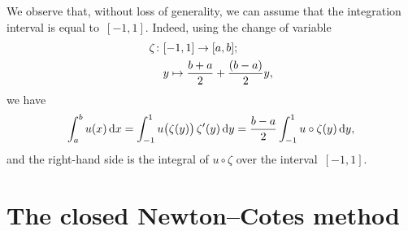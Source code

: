 We observe that,
without loss of generality,
we can assume that the integration interval is equal to~$[-1, 1]$.
Indeed, using the change of variable
\begin{align}
    \notag
    \zeta\colon &[-1, 1] \to [a, b]; \\
    \label{eq:change_of_variable_integration}
                &y \mapsto \frac{b+a}{2} + \frac{(b-a)}{2} y,
\end{align}
we have
\begin{equation}
    \label{eq:change_of_variable_equivalence}
    \int_{a}^{b} u(x) \, \mathrm d x
    = \int_{-1}^{1} u\bigl(\zeta(y)\bigr) \, \zeta'(y) \, \mathrm d y
    = \frac{b-a}{2}\int_{-1}^{1} u \circ \zeta (y) \, \mathrm d y,
\end{equation}
and the right-hand side is the integral of $u \circ \zeta$ over the interval~$[-1, 1]$.

\section{The closed Newton--Cotes method}
\label{sec:newton_cotes}


